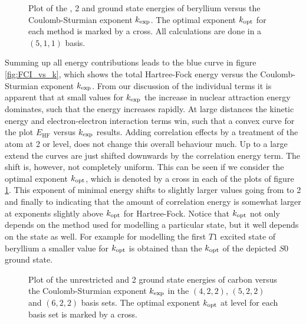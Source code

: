\begin{figure}
	\centering
	\caption[
		Plot of the \HF, {\MP}2 and \FCI energies
		versus the Coulomb-Sturmian exponent $\kexp$.
	]{
		Plot of the \HF, {\MP}2 and \FCI ground state energies
		of beryllium
		versus the Coulomb-Sturmian exponent $\kexp$.
		The optimal exponent $k_\text{opt}$ for each
		method is marked by a cross.
		All calculations are done in a $(5,1,1)$ \CS basis.
	}
	\label{fig:FCI_vs_k}
\end{figure}
Summing up all energy contributions leads to the blue curve
in figure \vref{fig:FCI_vs_k},
which shows the total Hartree-Fock energy versus
the Coulomb-Sturmian exponent $\kexp$.
From our discussion of the individual terms
it is apparent that at small values for $\kexp$
the increase in nuclear attraction energy dominates,
such that the \HF energy increases rapidly.
At large distances the kinetic energy and electron-electron
interaction terms win, such that a convex curve
for the plot $E_\text{HF}$ versus $\kexp$ results.
Adding correlation effects by a treatment of the atom at {\MP}2 or \FCI level,
does not change this overall behaviour much.
Up to a large extend the curves are just shifted downwards by the
correlation energy term.
The shift is, however, not completely uniform.
This can be seen if we consider the optimal \CS exponent $k_\text{opt}$,
which is denoted by a cross in each of the plots of figure \ref{fig:FCI_vs_k}.
This exponent of minimal energy shifts
to slightly larger values going from \HF to {\MP}2 and finally to \FCI
indicating that the amount of correlation energy is somewhat larger
at exponents slightly above $k_\text{opt}$ for Hartree-Fock.
Notice that $k_\text{opt}$ not only depends on the method used for modelling
a particular state,
but it well depends on the state as well.
For example for modelling the first $T1$ excited state of beryllium
a smaller value for $k_\text{opt}$ is obtained than the \FCI $k_\text{opt}$
of the depicted $S0$ ground state.

\begin{figure}
	\centering
	\caption[
		Dependency of the \HF and {\MP}2 energies
		on the \CS exponent $\kexp$
		and the basis set
	]{
		Plot of the unrestricted
		\HF and {\MP}2 ground state energies of carbon
		versus the Coulomb-Sturmian exponent $\kexp$
		in the $(4,2,2)$, $(5,2,2)$ and $(6,2,2)$ basis sets.
		The optimal exponent $k_\text{opt}$ at \HF level
		for each basis set is marked by a cross.
	}
	\label{fig:EHF_vs_k}
\end{figure}

